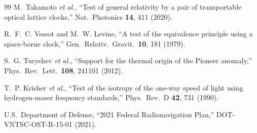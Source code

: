 \documentclass[12pt,letterpaper]{article}
\begin{document}
\begin{thebibliography}{99}
M.~Takamoto \textit{et al.},
``Test of general relativity by a pair of transportable optical lattice
clocks,''
Nat.\ Photonics \textbf{14}, 411 (2020).

R.~F.~C. Vessot and M.~W. Levine,
``A test of the equivalence principle using a space-borne clock,''
Gen.\ Relativ.\ Gravit.\ \textbf{10}, 181 (1979).

S.~G. Turyshev \textit{et al.},
``Support for the thermal origin of the Pioneer anomaly,''
Phys.\ Rev.\ Lett.\ \textbf{108}, 241101 (2012).

T.~P. Krisher \textit{et al.},
``Test of the isotropy of the one-way speed of light using hydrogen-maser
frequency standards,''
Phys.\ Rev.\ D \textbf{42}, 731 (1990).

U.S.\ Department of Defense,
``2021 Federal Radionavigation Plan,''
DOT-VNTSC-OST-R-15-01 (2021).

\end{thebibliography}
\end{document}
